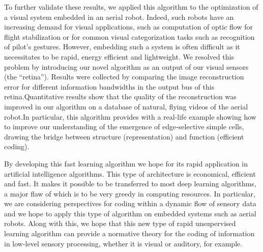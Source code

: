 \documentclass[a4paper, 11pt, draft]{article} %
\newcommand{\Acknowledgments}{%
This work was supported by XXX and the Doc2Amu project which received funding from a co-fund with the European Union's Horizon 2020 research and innovation programme and the region Provence Alpes Cote d'Azur. }
\begin{document}

To further validate these results, we applied this algorithm to the optimization of a visual system embedded in an aerial robot. Indeed, such robots have an increasing demand for visual applications, such as computation of optic flow for flight stabilization or for common visual categorization tasks such as recognition of pilot's gestures. However, embedding such a system is often difficult as it necessitates to be rapid,  energy efficient and lightweight. We resolved this problem by introducing our novel algorithm as an output of our visual sensors (the ``retina''). Results were collected by comparing the image reconstruction error for different information bandwidths in the output bus of this retina.Quantitative results show that the quality of the reconstruction was improved in our algorithm on a  database of natural, flying videos of the aerial robot.In particular, this algorithm provides with a real-life example showing how to improve our understanding of the emergence of edge-selective simple cells, drawing the bridge between structure (representation) and function (efficient coding).%
%


 By developing this
fast learning algorithm we hope for its rapid application in artificial
intelligence algorithms. This type of architecture is economical,
efficient and fast. It makes it possible to be transferred to most deep
learning algorithms, a major flaw of which is to be very greedy in
computing resources. In particular, we are considering perspectives for
coding within a dynamic flow of sensory data and we hope to apply this
type of algorithm on embedded systems such as aerial robots. Along with
this, we hope that this new type of rapid unsupervised learning
algorithm can provide a normative theory for the coding of information
in low-level sensory processing, whether it is visual or auditory, for
example.



\printbibliography
\end{document}
